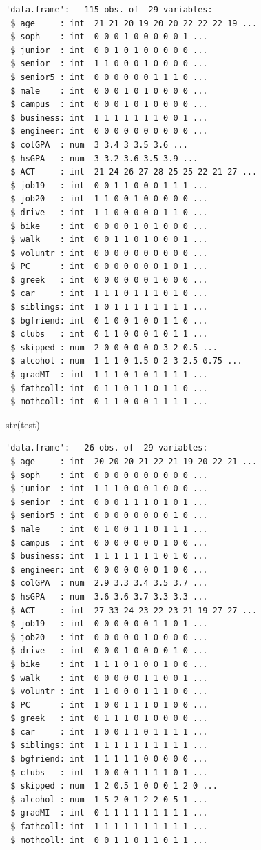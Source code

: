 \documentclass[
  letterpaper,
  DIV=11,
  numbers=noendperiod]{scrartcl}
\newenvironment{Shaded}{\begin{snugshade}}{\end{snugshade}}
\newcommand{\FunctionTok}[1]{\textcolor[rgb]{0.28,0.35,0.67}{#1}}
\newcommand{\NormalTok}[1]{\textcolor[rgb]{0.00,0.23,0.31}{#1}}
\begin{document}
\begin{verbatim}
'data.frame':   115 obs. of  29 variables:
 $ age     : int  21 21 20 19 20 20 22 22 22 19 ...
 $ soph    : int  0 0 0 1 0 0 0 0 0 1 ...
 $ junior  : int  0 0 1 0 1 0 0 0 0 0 ...
 $ senior  : int  1 1 0 0 0 1 0 0 0 0 ...
 $ senior5 : int  0 0 0 0 0 0 1 1 1 0 ...
 $ male    : int  0 0 0 1 0 1 0 0 0 0 ...
 $ campus  : int  0 0 0 1 0 1 0 0 0 0 ...
 $ business: int  1 1 1 1 1 1 1 0 0 1 ...
 $ engineer: int  0 0 0 0 0 0 0 0 0 0 ...
 $ colGPA  : num  3 3.4 3 3.5 3.6 ...
 $ hsGPA   : num  3 3.2 3.6 3.5 3.9 ...
 $ ACT     : int  21 24 26 27 28 25 25 22 21 27 ...
 $ job19   : int  0 0 1 1 0 0 0 1 1 1 ...
 $ job20   : int  1 1 0 0 1 0 0 0 0 0 ...
 $ drive   : int  1 1 0 0 0 0 0 1 1 0 ...
 $ bike    : int  0 0 0 0 1 0 1 0 0 0 ...
 $ walk    : int  0 0 1 1 0 1 0 0 0 1 ...
 $ voluntr : int  0 0 0 0 0 0 0 0 0 0 ...
 $ PC      : int  0 0 0 0 0 0 0 1 0 1 ...
 $ greek   : int  0 0 0 0 0 0 1 0 0 0 ...
 $ car     : int  1 1 1 0 1 1 1 0 1 0 ...
 $ siblings: int  1 0 1 1 1 1 1 1 1 1 ...
 $ bgfriend: int  0 1 0 0 1 0 0 1 1 0 ...
 $ clubs   : int  0 1 1 0 0 0 1 0 1 1 ...
 $ skipped : num  2 0 0 0 0 0 0 3 2 0.5 ...
 $ alcohol : num  1 1 1 0 1.5 0 2 3 2.5 0.75 ...
 $ gradMI  : int  1 1 1 0 1 0 1 1 1 1 ...
 $ fathcoll: int  0 1 1 0 1 1 0 1 1 0 ...
 $ mothcoll: int  0 1 1 0 0 0 1 1 1 1 ...
\end{verbatim}

\begin{Shaded}
\begin{Highlighting}[]
\FunctionTok{str}\NormalTok{(test)}
\end{Highlighting}
\end{Shaded}

\begin{verbatim}
'data.frame':   26 obs. of  29 variables:
 $ age     : int  20 20 20 21 22 21 19 20 22 21 ...
 $ soph    : int  0 0 0 0 0 0 0 0 0 0 ...
 $ junior  : int  1 1 1 0 0 0 1 0 0 0 ...
 $ senior  : int  0 0 0 1 1 1 0 1 0 1 ...
 $ senior5 : int  0 0 0 0 0 0 0 0 1 0 ...
 $ male    : int  0 1 0 0 1 1 0 1 1 1 ...
 $ campus  : int  0 0 0 0 0 0 0 1 0 0 ...
 $ business: int  1 1 1 1 1 1 1 0 1 0 ...
 $ engineer: int  0 0 0 0 0 0 0 1 0 0 ...
 $ colGPA  : num  2.9 3.3 3.4 3.5 3.7 ...
 $ hsGPA   : num  3.6 3.6 3.7 3.3 3.3 ...
 $ ACT     : int  27 33 24 23 22 23 21 19 27 27 ...
 $ job19   : int  0 0 0 0 0 0 1 1 0 1 ...
 $ job20   : int  0 0 0 0 0 1 0 0 0 0 ...
 $ drive   : int  0 0 0 1 0 0 0 0 1 0 ...
 $ bike    : int  1 1 1 0 1 0 0 1 0 0 ...
 $ walk    : int  0 0 0 0 0 1 1 0 0 1 ...
 $ voluntr : int  1 1 0 0 0 1 1 1 0 0 ...
 $ PC      : int  1 0 0 1 1 1 0 1 0 0 ...
 $ greek   : int  0 1 1 1 0 1 0 0 0 0 ...
 $ car     : int  1 0 0 1 1 0 1 1 1 1 ...
 $ siblings: int  1 1 1 1 1 1 1 1 1 1 ...
 $ bgfriend: int  1 1 1 1 1 0 0 0 0 0 ...
 $ clubs   : int  1 0 0 0 1 1 1 1 0 1 ...
 $ skipped : num  1 2 0.5 1 0 0 0 1 2 0 ...
 $ alcohol : num  1 5 2 0 1 2 2 0 5 1 ...
 $ gradMI  : int  0 1 1 1 1 1 1 1 1 1 ...
 $ fathcoll: int  1 1 1 1 1 1 1 1 1 1 ...
 $ mothcoll: int  0 0 1 1 0 1 1 0 1 1 ...
\end{verbatim}
\end{document}
